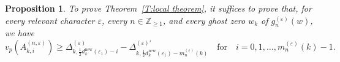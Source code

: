 \documentclass[12pt]{amsart}
\newtheorem{proposition}[subsection]{Proposition}
\theoremstyle{definition}
\newtheorem{remark}[subsection]{Remark}
\numberwithin{equation}{subsection}
\def\ZZ{\mathbb{Z}}
\newcommand{\new}{\mathrm{new}}
\begin{document}
\begin{proposition}
\label{P:Lagrange general}
To prove Theorem~\ref{T:local theorem}, it suffices to prove that, for every relevant character $\varepsilon$, every $n \in\ZZ_{\geq 1}$, and every ghost zero $w_k$ of $g_n^{(\varepsilon)}(w)$, we have
\begin{equation}
\label{E:ghost reduction to k}
v_p(A_{k,i}^{(n,\varepsilon)}) \geq \Delta^{(\varepsilon)}_{k,\frac 12 d_{k}^\new(\varepsilon_1) -i} - \Delta^{(\varepsilon)\prime}_{k, \frac 12 d_{k}^\mathrm{new}(\varepsilon_1) - m_n^{(\varepsilon)}(k)} \quad \textrm{for} \quad i = 0,1, \dots, m_n^{(\varepsilon)}(k)-1.
\end{equation}
\end{proposition}
\end{document}
